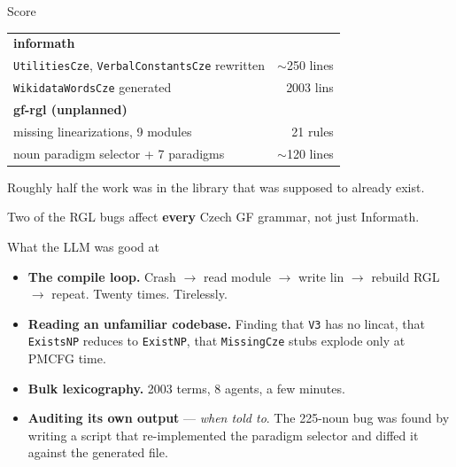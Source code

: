\documentclass[10pt,aspectratio=169]{beamer}
\begin{document}
\begin{frame}{Score}
  \begin{center}
  \begin{tabular}{lr}
    \toprule
    \textbf{informath} & \\
    \quad \texttt{UtilitiesCze}, \texttt{VerbalConstantsCze} rewritten & $\sim$250 lines \\
    \quad \texttt{WikidataWordsCze} generated & 2003 lins \\
    \midrule
    \textbf{gf-rgl (unplanned)} & \\
    \quad missing linearizations, 9 modules & 21 rules \\
    \quad noun paradigm selector + 7 paradigms & $\sim$120 lines \\
    \bottomrule
  \end{tabular}
  \end{center}

  \vspace{1em}
  Roughly half the work was in the library that was supposed to already exist.

  \vspace{0.5em}
  Two of the RGL bugs affect \textbf{every} Czech GF grammar, not just Informath.
\end{frame}

\begin{frame}{What the LLM was good at}
  \begin{itemize}
    \item \textbf{The compile loop.} Crash $\rightarrow$ read module $\rightarrow$
          write lin $\rightarrow$ rebuild RGL $\rightarrow$ repeat. Twenty times. Tirelessly.
    \item \textbf{Reading an unfamiliar codebase.} Finding that \texttt{V3} has no
          lincat, that \texttt{ExistsNP} reduces to \texttt{ExistNP}, that
          \texttt{MissingCze} stubs explode only at PMCFG time.
    \item \textbf{Bulk lexicography.} 2003 terms, 8 agents, a few minutes.
    \item \textbf{Auditing its own output} --- \emph{when told to}. The 225-noun
          bug was found by writing a script that re-implemented the paradigm
          selector and diffed it against the generated file.
  \end{itemize}
\end{frame}
\end{document}
